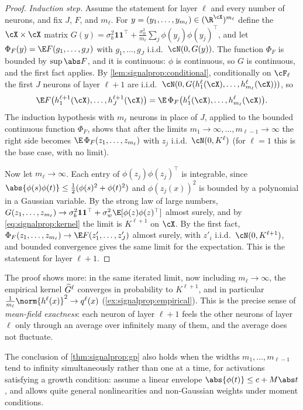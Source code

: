 \begin{refsection}
\begin{proof}
\emph{Induction step.} Assume the statement for layer $\ell$ and every number of neurons, and fix $J$, $F$, and $m_\ell$. For $y=(y_1,\dots,y_{m_\ell})\in(\R^{\cX})^{m_\ell}$ define the $\cX\times\cX$ matrix $G(y)=\sigma_b^2\mathbf 1\mathbf 1^\top+\frac{\sigma_w^2}{m_\ell}\sum_j\phi(y_j)\phi(y_j)^\top$, and let $\Phi_F(y)=\E F(g_1,\dots,g_J)$ with $g_1,\dots,g_J$ i.i.d.\ $\cN(0,G(y))$. The function $\Phi_F$ is bounded by $\sup\abs F$, and it is continuous: $\phi$ is continuous, so $G$ is continuous, and the first fact applies. By \cref{lem:signalprop:conditional}, conditionally on $\cF_\ell$ the first $J$ neurons of layer $\ell+1$ are i.i.d.\ $\cN(0,G(h^\ell_1(\cX),\dots,h^\ell_{m_\ell}(\cX)))$, so
\[
  \E F\bigl(h^{\ell+1}_1(\cX),\dots,h^{\ell+1}_J(\cX)\bigr)=\E\,\Phi_F\bigl(h^\ell_1(\cX),\dots,h^\ell_{m_\ell}(\cX)\bigr).
\]
The induction hypothesis with $m_\ell$ neurons in place of $J$, applied to the bounded continuous function $\Phi_F$, shows that after the limits $m_1\to\infty,\dots,m_{\ell-1}\to\infty$ the right side becomes $\E\,\Phi_F(z_1,\dots,z_{m_\ell})$ with $z_j$ i.i.d.\ $\cN(0,K^\ell)$ (for $\ell=1$ this is the base case, with no limit).

Now let $m_\ell\to\infty$. Each entry of $\phi(z_j)\phi(z_j)^\top$ is integrable, since $\abs{\phi(s)\phi(t)}\le\frac12(\phi(s)^2+\phi(t)^2)$ and $\phi(z_j(x))^2$ is bounded by a polynomial in a Gaussian variable. By the strong law of large numbers, $G(z_1,\dots,z_{m_\ell})\to\sigma_b^2\mathbf 1\mathbf 1^\top+\sigma_w^2\E[\phi(z)\phi(z)^\top]$ almost surely, and by \eqref{eq:signalprop:kernel} the limit is $K^{\ell+1}$ on $\cX$. By the first fact, $\Phi_F(z_1,\dots,z_{m_\ell})\to\E F(z'_1,\dots,z'_J)$ almost surely, with $z'_i$ i.i.d.\ $\cN(0,K^{\ell+1})$, and bounded convergence gives the same limit for the expectation. This is the statement for layer $\ell+1$.
\end{proof}

The proof shows more: in the same iterated limit, now including $m_\ell\to\infty$, the empirical kernel $\widehat{G}^\ell$ converges in probability to $K^{\ell+1}$, and in particular $\frac1{m_\ell}\norm{h^\ell(x)}^2\to q^\ell(x)$ (\cref{ex:signalprop:empirical}). This is the precise sense of \emph{mean-field exactness}: each neuron of layer $\ell+1$ feels the other neurons of layer $\ell$ only through an average over infinitely many of them, and the average does not fluctuate.

\begin{theorem}\label{thm:signalprop:simultaneous}
The conclusion of \cref{thm:signalprop:gp} also holds when the widths $m_1,\dots,m_{\ell-1}$ tend to infinity simultaneously rather than one at a time, for activations satisfying a growth condition: \textcite{MatthewsEtAl2018} assume a linear envelope $\abs{\phi(t)}\le c+M\abs t$, and \textcite{Hanin2023} allows quite general nonlinearities and non-Gaussian weights under moment conditions.
\end{theorem}


\end{refsection}
